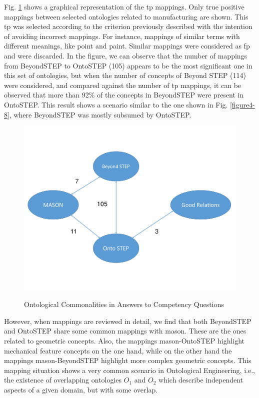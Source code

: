 Fig. \ref{figure4-9} shows a graphical representation of the \gls{tp} mappings.  Only true positive mappings  between selected ontologies related to manufacturing are shown. This \gls{tp} was selected according to the criterion previously described with the intention of avoiding incorrect mappings. For instance, mappings of similar terms with different meanings, like point and paint. Similar mappings were considered as \gls{fp} and were discarded. In the figure, we can observe that the number of mappings from BeyondSTEP to OntoSTEP (105) appears to be the most significant one in this set of ontologies, but when the number of concepts of Beyond STEP (114) were considered, and compared against the number of \gls{tp} mappings, it can be observed that more than 92\% of the concepts in BeyondSTEP were present in OntoSTEP. This result shows a scenario similar to the one shown in Fig. \ref{figure4-8}, where BeyondSTEP was mostly subsumed by OntoSTEP.  


\begin{figure}
	\begin{center}
		\vspace{-20mm}
		\includegraphics[scale=0.5]{figure-chapterIV/fig4-9}\\
		\vspace{-10mm}
		\caption{Ontological Commonalities in Answers to Competency Questions}
		\label{figure4-9}
	\end{center}
\end{figure}



However, when mappings are reviewed in detail, we find that both BeyondSTEP and OntoSTEP share some common mappings with \gls{mason}. These are the ones related to geometric concepts. Also, the mappings \gls{mason}-OntoSTEP highlight mechanical feature concepts on the one hand, while on the other hand the mappings   \gls{mason}-BeyondSTEP highlight more complex geometric concepts. This mapping situation shows a very common scenario in Ontological Engineering, i.e., the existence of    overlapping ontologies $O_{1}$ and $O_{2}$ which describe independent aspects of a given domain, but with some overlap. 


